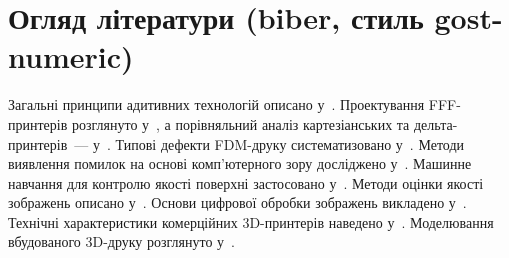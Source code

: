 \documentclass[14pt]{extarticle}
\begin{document}
\section*{Огляд літератури (biber, стиль gost-numeric)}

Загальні принципи адитивних технологій описано у~\cite{Gibson2021}.
Проектування FFF-принтерів розглянуто у~\cite{Soni2021},
а порівняльний аналіз картезіанських та дельта-принтерів~--- у~\cite{Schmitt2018}.
Типові дефекти FDM-друку систематизовано у~\cite{Baechle2022}.
Методи виявлення помилок на основі комп'ютерного зору досліджено
у~\cite{Baumann2016, Langeland2020, Paulsen2019}.
Машинне навчання для контролю якості поверхні застосовано у~\cite{Kadam2021}.
Методи оцінки якості зображень описано у~\cite{Crete2007, Wang2005}.
Основи цифрової обробки зображень викладено у~\cite{Gonzalez2018}.
Технічні характеристики комерційних 3D-принтерів наведено у~\cite{BambuLabA1Mini}.
Моделювання вбудованого 3D-друку розглянуто у~\cite{VanDriel2025}.

\nocite{*}

\printbibliography[title={Список використаних джерел}]
\end{document}
